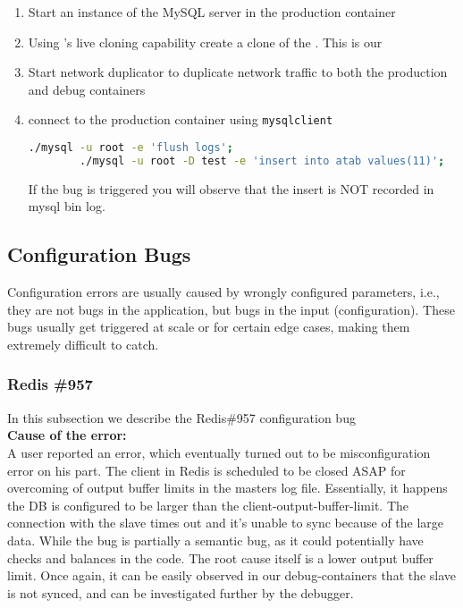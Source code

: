 \begin{adjustwidth}{0.5cm}{}
	\begin{enumerate}
		\item Start an instance of the MySQL server in the production container
		\item Using \parikshan's live cloning capability create a clone of the \productioncontainer. This is our \debugcontainer
		\item Start network duplicator to duplicate network traffic to both the production and debug containers
		\item connect to the production container using \texttt{mysqlclient}
		
		\begin{lstlisting}[language=sh]
		./mysql -u root -e 'flush logs';
		./mysql -u root -D test -e 'insert into atab values(11)';
		\end{lstlisting}
		
		If the bug is triggered you will observe that the insert is NOT recorded in mysql bin log.
		
	\end{enumerate}
\end{adjustwidth}	


\subsection{Configuration Bugs}
Configuration errors are usually caused by wrongly configured parameters, i.e., they are not bugs in the application, but bugs in the input (configuration).
These bugs usually get triggered at scale or for certain edge cases, making them extremely difficult to catch.


\subsubsection{Redis \#957}

In this subsection we describe the Redis\#957 configuration bug \\

\noindent \textbf{Cause of the error:} \\

A user reported an error, which eventually turned out to be misconfiguration error on his part.
The client in Redis is scheduled to be closed ASAP for overcoming of output buffer limits in the masters log file.
Essentially, it happens the DB is configured to be larger than the client-output-buffer-limit.
The connection with the slave times out and it's unable to sync because of the large data.
While the bug is partially a semantic bug, as it could potentially have checks and balances in the code. 
The root cause itself is a lower output buffer limit.
Once again, it can be easily observed in our debug-containers that the slave is not synced, and can be investigated further by the debugger.

